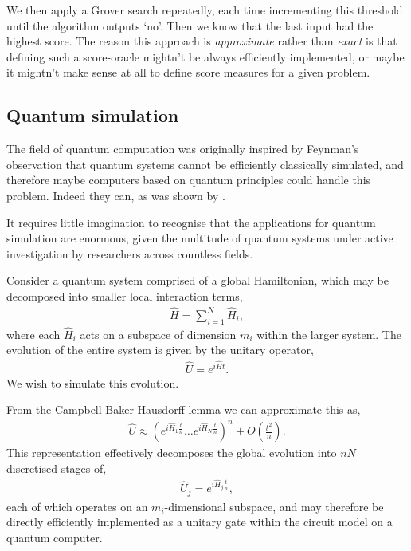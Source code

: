 We then apply a Grover search repeatedly, each time incrementing this threshold until the algorithm outputs `no'. Then we know that the last input had the highest score. The reason this approach is \textit{approximate} rather than \textit{exact} is that defining such a score-oracle mightn't be always efficiently implemented, or maybe it mightn't make sense at all to define score measures for a given problem.

%
%

\subsection{Quantum simulation} \label{sec:quantum_sim_alg}

The field of quantum computation was originally inspired by Feynman's observation that quantum systems cannot be efficiently classically simulated, and therefore maybe computers based on quantum principles could handle this problem. Indeed they can, as was shown by \cite{bib:lloyd1996universal}.

It requires little imagination to recognise that the applications for quantum simulation are enormous, given the multitude of quantum systems under active investigation by researchers across countless fields.

Consider a quantum system comprised of a global Hamiltonian, which may be decomposed into smaller local interaction terms,
\begin{align} \label{eq:Ham_sim_Ham}
\hat{H} = \sum_{i=1}^N \hat{H}_i	,
\end{align}
where each $\hat{H}_i$ acts on a subspace of dimension $m_i$ within the larger system. The evolution of the entire system is given by the unitary operator,
\begin{align}
\hat{U} = e^{i\hat{H}t}.
\end{align}
We wish to simulate this evolution.

From the Campbell-Baker-Hausdorff lemma we can approximate this as,
\begin{align}\label{eq:CBH_lemma}
	\hat{U} \approx \left(e^{i\hat{H}_1\frac{t}{n}}\dots e^{i\hat{H}_N\frac{t}{n}}\right)^n + O\left(\frac{t^2}{n}\right).
\end{align}
This representation effectively decomposes the global evolution into $nN$ discretised stages of,
\begin{align}
	\hat{U}_j = e^{i\hat{H}_j\frac{t}{n}},
\end{align}
each of which operates on an $m_i$-dimensional subspace, and may therefore be directly efficiently implemented as a unitary gate within the circuit model on a quantum computer. 

